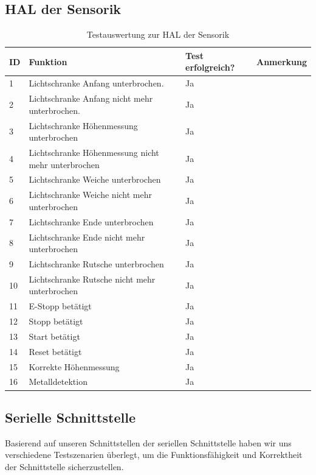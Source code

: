 \documentclass[a4paper, 11pt]{article}
\begin{document}
\newpage

\subsection{HAL der Sensorik}
\begin{table}[H]
\center
    \begin{tabularx}{\textwidth}{|l|X|X|X|}
        \hline
        \textbf{ID}&\textbf{Funktion}&\textbf{Test erfolgreich?}&\textbf{Anmerkung}\\
        \hline
        1&Lichtschranke Anfang unterbrochen.&Ja&\\
        \hline
        2&Lichtschranke Anfang nicht mehr unterbrochen.&Ja&\\
        \hline
        3&Lichtschranke Höhenmessung unterbrochen&Ja&\\
        \hline
        4&Lichtschranke Höhenmessung nicht mehr unterbrochen&Ja&\\
        \hline
        5&Lichtschranke Weiche unterbrochen&Ja&\\
        \hline
        6&Lichtschranke Weiche nicht mehr unterbrochen&Ja&\\
        \hline
        7&Lichtschranke Ende unterbrochen&Ja&\\
        \hline
        8&Lichtschranke Ende nicht mehr unterbrochen&Ja&\\
        \hline
        9&Lichtschranke Rutsche unterbrochen&Ja&\\
        \hline
        10&Lichtschranke Rutsche nicht mehr unterbrochen&Ja&\\
        \hline
        11&E-Stopp betätigt&Ja&\\
        \hline
        12&Stopp betätigt&Ja&\\
        \hline
        13&Start betätigt&Ja&\\
        \hline
        14&Reset betätigt&Ja&\\
        \hline
        15&Korrekte Höhenmessung&Ja&\\
        \hline
        16&Metalldetektion&Ja&\\
        \hline
    \end{tabularx}
    \caption{Testauswertung zur HAL der Sensorik}
    \label{tstsens}
\end{table}

\newpage

\subsection{Serielle Schnittstelle}
Basierend auf unseren Schnittstellen der seriellen Schnittstelle haben wir uns verschiedene Testszenarien überlegt, um die Funktionsfähigkeit und Korrektheit der Schnittstelle sicherzustellen.
\end{document}
